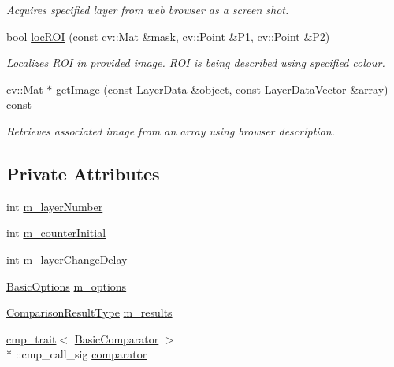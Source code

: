 \begin{DoxyCompactItemize}
\begin{DoxyCompactList}\small\item\em Acquires specified layer from web browser as a screen shot. \end{DoxyCompactList}\item 
bool \hyperlink{classwpc_1_1_basic_loader_a0ab4391f59be82bab93b8e248f689a96}{loc\-R\-O\-I} (const cv\-::\-Mat \&mask, cv\-::\-Point \&P1, cv\-::\-Point \&P2)
\begin{DoxyCompactList}\small\item\em Localizes R\-O\-I in provided image. R\-O\-I is being described using specified colour. \end{DoxyCompactList}\item 
cv\-::\-Mat $\ast$ \hyperlink{classwpc_1_1_basic_loader_ac16dabc4773e364f56aabe52c7d8d93e}{get\-Image} (const \hyperlink{structwpc_1_1_layer_data}{Layer\-Data} \&object, const \hyperlink{namespacewpc_a778a3f9b2be5b4dd228ea2c752dc7aa2}{Layer\-Data\-Vector} \&array) const 
\begin{DoxyCompactList}\small\item\em Retrieves associated image from an array using browser description. \end{DoxyCompactList}\end{DoxyCompactItemize}
\subsection*{Private Attributes}
\begin{DoxyCompactItemize}
\item 
int \hyperlink{classwpc_1_1_basic_loader_a3b78c6d764a8ee7985b7ec471eb9d276}{m\-\_\-layer\-Number}
\item 
int \hyperlink{classwpc_1_1_basic_loader_afc1f23543a23f8f3afbec0b9d6d8837e}{m\-\_\-counter\-Initial}
\item 
int \hyperlink{classwpc_1_1_basic_loader_a9d5e11507f6111f601016f1b06b2eecd}{m\-\_\-layer\-Change\-Delay}
\item 
\hyperlink{classwpc_1_1_basic_options}{Basic\-Options} \hyperlink{classwpc_1_1_basic_loader_a869f709a80ee7a0c5a47d12c11fc4d14}{m\-\_\-options}
\item 
\hyperlink{classwpc_1_1_basic_loader_abae37c020f8996c8cd770db2edcb3bea}{Comparison\-Result\-Type} \hyperlink{classwpc_1_1_basic_loader_a7b03bfcc76578e8a45b1f70495541b72}{m\-\_\-results}
\item 
\hyperlink{structwpc_1_1cmp__trait}{cmp\-\_\-trait}$<$ \hyperlink{classwpc_1_1_basic_comparator}{Basic\-Comparator} $>$\\*
\-::cmp\-\_\-call\-\_\-sig \hyperlink{classwpc_1_1_basic_loader_a6ce950ebdb25b76dafde911ca69bfced}{comparator}
\end{DoxyCompactItemize}
